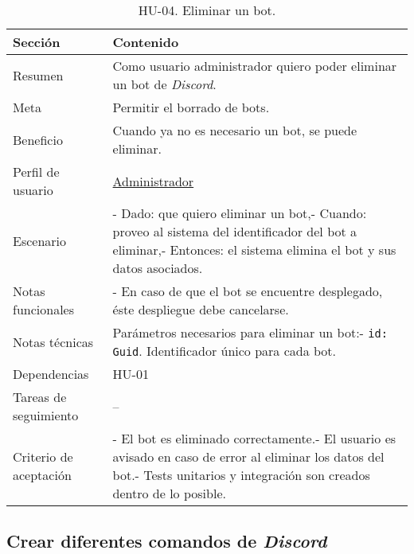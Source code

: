 \begin{table}[H]
    \centering
    \def\arraystretch{1.25}
    \begin{adjustbox}{max width=\textwidth}
    \begin{tabularx}{\textwidth}{l|L}
    \hline
        \textbf{Sección} & \textbf{Contenido} \\ \hline
    \hline
        Resumen & Como usuario administrador quiero poder eliminar un bot de \textit{Discord}. \\ \hline
        Meta & Permitir el borrado de bots. \\ \hline
        Beneficio & Cuando ya no es necesario un bot, se puede eliminar. \\ \hline
        Perfil de usuario & \hyperref[sec:personaAdmin]{Administrador} \\ \hline
        Escenario & - Dado: que quiero eliminar un bot,\linebreak - Cuando: proveo al sistema del identificador del bot a eliminar,\linebreak - Entonces: el sistema elimina el bot y sus datos asociados. \\ \hline
        Notas funcionales & -  En caso de que el bot se encuentre desplegado, éste despliegue debe cancelarse. \\ \hline
        Notas técnicas & Parámetros necesarios para eliminar un bot:\linebreak - \verb|id: Guid|. Identificador único para cada bot. \\ \hline
        Dependencias & HU-01 \\ \hline
        Tareas de seguimiento & – \\ \hline
        Criterio de aceptación & - El bot es eliminado correctamente.\linebreak - El usuario es avisado en caso de error al eliminar los datos del bot.\linebreak - Tests unitarios y integración son creados dentro de lo posible. \\ \hline
    \end{tabularx}
    \end{adjustbox}
    \caption{HU-04. Eliminar un bot.}
\end{table}


\subsection{Crear diferentes comandos de \textit{Discord}}

